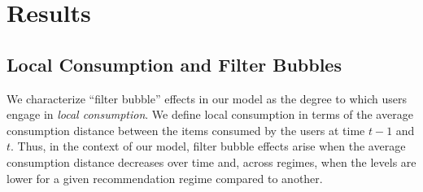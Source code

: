 \documentclass[manuscript]{acmart}
\begin{document}
\section{Results}
\subsection{Local Consumption and Filter Bubbles}
We characterize ``filter bubble'' effects in our model as the degree to which users engage in \textit{local consumption}. We define local consumption in terms of the average consumption distance between the items consumed by the users at time $t-1$ and $t$. Thus, in the context of our model, filter bubble effects arise when the average consumption distance decreases over time and, across regimes, when the levels are lower for a given recommendation regime compared to another.
\end{document}
